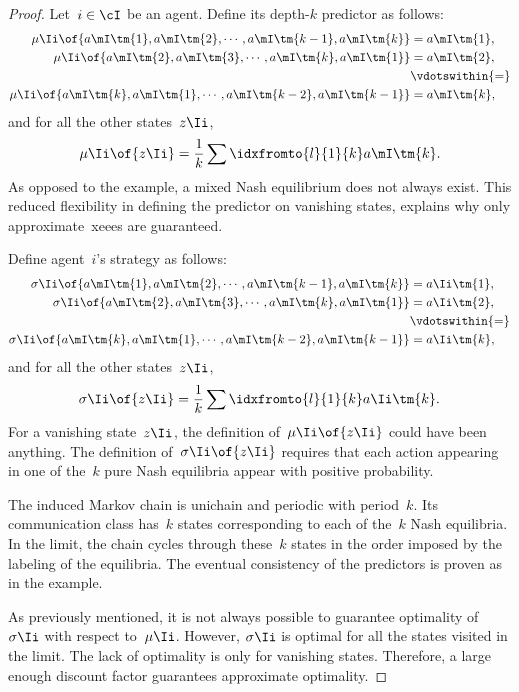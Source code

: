 \begin{proof}
Let~\(i \in \cI\) be an agent.
Define its depth-\(k\) predictor as follows:
\[
\begin{aligned}
\mu\Ii \of {a\mI\tm{1}, a\mI\tm{2}, \cdots, a\mI\tm{k - 1}, a\mI\tm{k}} & = a\mI\tm{1}, \\
\mu\Ii \of {a\mI\tm{2}, a\mI\tm{3}, \cdots, a\mI\tm{k}, a\mI\tm{1}} & = a\mI\tm{2}, \\
&\vdotswithin{=} \\
\mu\Ii \of {a\mI\tm{k}, a\mI\tm{1}, \cdots, a\mI\tm{k - 2}, a\mI\tm{k - 1}} & = a\mI\tm{k},
\end{aligned}
\]
and for all the other states~\(z\Ii\),
\[
\mu\Ii \of {z\Ii} = \frac{1}{k} \sum\idxfromto{l}{1}{k} a\mI\tm{k}.
\]
As opposed to the example, a mixed Nash equilibrium does not always exist.
This reduced flexibility in defining the predictor on vanishing states, explains why only approximate~\acp{xeee} are guaranteed.

Define agent~\(i\)'s strategy as follows:
\[
\begin{aligned}
\sigma\Ii \of {a\mI\tm{1}, a\mI\tm{2}, \cdots, a\mI\tm{k - 1}, a\mI\tm{k}} &= a\Ii\tm{1}, \\
\sigma\Ii \of {a\mI\tm{2}, a\mI\tm{3}, \cdots, a\mI\tm{k}, a\mI\tm{1}} &= a\Ii\tm{2}, \\
&\vdotswithin{=} \\
\sigma\Ii \of {a\mI\tm{k}, a\mI\tm{1}, \cdots, a\mI\tm{k - 2}, a\mI\tm{k - 1}} &= a\Ii\tm{k},
\end{aligned}
\]
and for all the other states~\(z\Ii\),
\[
\sigma\Ii \of {z\Ii} = \frac{1}{k} \sum\idxfromto{l}{1}{k} a\Ii\tm{k}.
\]
For a vanishing state~\(z\Ii\), the definition of~\(\mu\Ii \of {z\Ii}\) could have been anything.
The definition of~\(\sigma\Ii \of {z\Ii}\) requires that each action appearing in one of the~\(k\) pure Nash equilibria appear with positive probability.

The induced Markov chain is unichain and periodic with period~\(k\).
Its communication class has~\(k\) states corresponding to each of the~\(k\) Nash equilibria.
In the limit, the chain cycles through these~\(k\) states in the order imposed by the labeling of the equilibria.
The eventual consistency of the predictors is proven as in the example.

As previously mentioned, it is not always possible to guarantee optimality of~\(\sigma\Ii\) with respect to~\(\mu\Ii\).
However, \(\sigma\Ii\) is optimal for all the states visited in the limit.
The lack of optimality is only for vanishing states.
Therefore, a large enough discount factor guarantees approximate optimality.
\end{proof}

